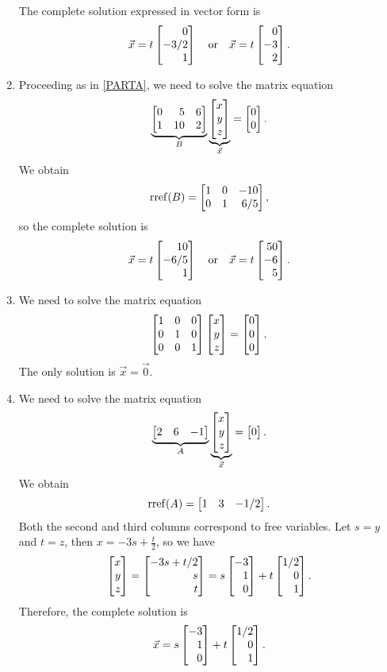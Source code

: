 \begin{exercises}
\begin{problist}
\begin{solution}
\begin{enumerate}
				The complete solution expressed in vector form is
				\[
					\vec x = t\mat{0\\-3/2\\1} \quad \text{or} \quad \vec x = t\mat{0\\-3\\2}.
				\]
				\item  Proceeding as in \ref{PARTA}, we need to solve the matrix equation
				\[
					\underbrace{\mat{0&5&6\\1&10&2} }_{B} \underbrace{\mat{x\\y\\z}}_{\vec{x}} = \mat{0\\0}.
				\]
				We obtain
				\[
					\rref (B) = \mat{1&0&-10\\0&1&6/5},
				\]
				so the complete solution is 
				\[
					\vec x = t\mat{10\\-6/5\\1} \quad \text{or} \quad \vec x = t\mat{50\\-6\\5}.
				\]


				\item We need to solve the matrix equation
				\[
					\mat{1&0&0\\0&1&0\\0&0&1} \mat{x\\y\\z} = \mat{0\\0\\0}.
				\]
				The only solution is $\vec x = \vec 0$.


				\item We need to solve the matrix equation
				\[
					\underbrace{\mat{2&6&-1} }_{A} \underbrace{\mat{x\\y\\z}}_{\vec x} = \mat{0}.
				\]
				We obtain
				\[
					\rref (A) = \mat{1&3&-1/2}.
				\]
				Both the second and third columns correspond to free variables. Let $s=y$ and $t=z$, then $x = -3s + \frac{t}{2}$, so we have
				\[
					\mat{x\\y\\z} = \mat{-3s+t/2\\s\\t} = s\mat{-3\\1\\0} + t\mat{1/2\\0\\1}.
				\]
				Therefore, the complete solution is
				\[
					\vec x = s\mat{-3\\1\\0} + t\mat{1/2\\0\\1}.
				\]
			\end{enumerate}
		\end{solution}	


\end{problist}
\end{exercises}
